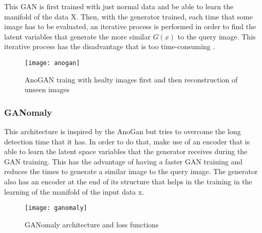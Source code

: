 This GAN is first trained with just normal data and be able to learn the manifold of the data X. Then, with the generator trained, each time that some image has to be evaluated, an iterative process is performed in order to find the latent variables that generate the more similar \begin{math}G(x)\end{math} to the query image. This iterative process has the disadvantage that is too time-consuming \cite{Schlegl2017}.

\begin{figure}[htb]
  \centering
  \texttt{[image: anogan]}
  \caption[AnoGAN]{AnoGAN traing with healty images first and then reconstruction of unseen images\cite{Schlegl2017}}
  \label{fig:anogan}
\end{figure}

\subsubsection{GANomaly}

This architecture is inspired by the AnoGan but tries to overcome the long detection time that it has. In order to do that, make use of an encoder that is able to learn the latent space variables that the generator receives during the GAN training. This has the advantage of having a faster GAN training and reduces the times to generate a similar image to the query image. The generator also has an encoder at the end of its structure that helps in the training in the learning of the manifold of the input data x.

\begin{figure}[htb]
  \centering
  \texttt{[image: ganomaly]}
  \caption[AnoGAN]{GANomaly architecture and loss functions \cite{DiMattia2019}}
  \label{fig:ganomaly}
\end{figure}
